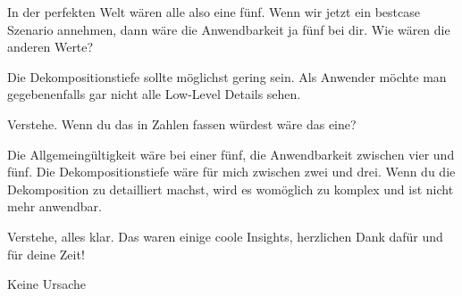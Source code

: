 \LF In der perfekten Welt wären alle also eine fünf. Wenn wir jetzt ein bestcase Szenario annehmen, dann wäre die Anwendbarkeit ja fünf bei dir. Wie wären die anderen Werte?

\PE Die Dekompositionstiefe sollte möglichst gering sein. Als Anwender möchte man gegebenenfalls gar nicht alle Low-Level Details sehen.

\LF Verstehe. Wenn du das in Zahlen fassen würdest wäre das eine?

\PE Die Allgemeingültigkeit wäre bei einer fünf, die Anwendbarkeit zwischen vier und fünf. Die Dekompositionstiefe wäre für mich zwischen zwei und drei. Wenn du die Dekomposition zu detailliert machst, wird es womöglich zu komplex und ist nicht mehr anwendbar.

\LF Verstehe, alles klar. Das waren einige coole Insights, herzlichen Dank dafür und für deine Zeit!

\PE Keine Ursache